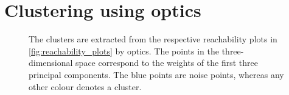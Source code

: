\section{Clustering using \acs{optics}}\label{sec:evaluation-OPTICS}
\begin{figure}[!htp]%
    \centering
    \qquad
    \caption[\acs*{optics} clusters]{The clusters are extracted from the respective reachability plots in \autoref{fig:reachability_plots} by \ac{optics}.
    The points in the three-dimensional space correspond to the weights of the first three principal components.
    The blue points are noise points, whereas any other colour denotes a cluster.}%
    \label{fig:optics_cluster}%
\end{figure}

